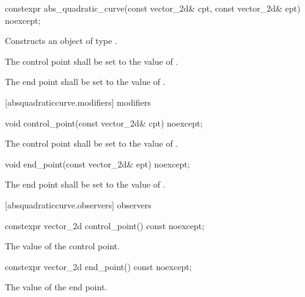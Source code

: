 \begin{itemdecl}
constexpr abs_quadratic_curve(const vector_2d& cpt, const vector_2d& ept)
  noexcept;
\end{itemdecl}
\begin{itemdescr}
	\pnum
	\effects
	Constructs an object of type .
	
	\pnum
	The control point shall be set to the value of .
	
	\pnum
	The end point shall be set to the value of .
\end{itemdescr}

 [absquadraticcurve.modifiers]{ modifiers}

\begin{itemdecl}
void control_point(const vector_2d& cpt) noexcept;
\end{itemdecl}
\begin{itemdescr}
	\pnum
	\effects
	The control point shall be set to the value of .
\end{itemdescr}

\begin{itemdecl}
void end_point(const vector_2d& ept) noexcept;
\end{itemdecl}
\begin{itemdescr}
	\pnum
	\effects
	The end point shall be set to the value of .
\end{itemdescr}

 [absquadraticcurve.observers]{ observers}

\begin{itemdecl}
constexpr vector_2d control_point() const noexcept;
\end{itemdecl}
\begin{itemdescr}
	\pnum
	\returns
	The value of the control point.
\end{itemdescr}

\begin{itemdecl}
constexpr vector_2d end_point() const noexcept;
\end{itemdecl}
\begin{itemdescr}
	\pnum
	\returns
	The value of the end point.
\end{itemdescr}
